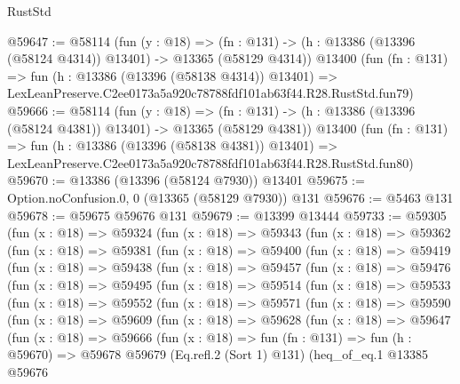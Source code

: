 \begin{lexlean}{RustStd}
\begin{coremodule}
@59647 := @58114
    (fun (y : @18) =>
    (fn : @131) -> (h : @13386 (@13396 (@58124 @4314)) @13401) -> @13365 (@58129 @4314))
    @13400
    (fun (fn : @131) =>
    fun (h : @13386 (@13396 (@58138 @4314)) @13401) =>
    LexLeanPreserve.C2ee0173a5a920c78788fdf101ab63f44.R28.RustStd.fun79)
@59666 := @58114
    (fun (y : @18) =>
    (fn : @131) -> (h : @13386 (@13396 (@58124 @4381)) @13401) -> @13365 (@58129 @4381))
    @13400
    (fun (fn : @131) =>
    fun (h : @13386 (@13396 (@58138 @4381)) @13401) =>
    LexLeanPreserve.C2ee0173a5a920c78788fdf101ab63f44.R28.RustStd.fun80)
@59670 := @13386 (@13396 (@58124 @7930)) @13401
@59675 := Option.noConfusion.{0, 0} (@13365 (@58129 @7930)) @131
@59676 := @5463 @131
@59678 := @59675 @59676 @131
@59679 := @13399 @13444
@59733 := @59305
    (fun (x : @18) =>
    @59324
      (fun (x : @18) =>
      @59343
        (fun (x : @18) =>
        @59362
          (fun (x : @18) =>
          @59381
            (fun (x : @18) =>
            @59400
              (fun (x : @18) =>
              @59419
                (fun (x : @18) =>
                @59438
                  (fun (x : @18) =>
                  @59457
                    (fun (x : @18) =>
                    @59476
                      (fun (x : @18) =>
                      @59495
                        (fun (x : @18) =>
                        @59514
                          (fun (x : @18) =>
                          @59533
                            (fun (x : @18) =>
                            @59552
                              (fun (x : @18) =>
                              @59571
                                (fun (x : @18) =>
                                @59590
                                  (fun (x : @18) =>
                                  @59609
                                    (fun (x : @18) =>
                                    @59628
                                      (fun (x : @18) =>
                                      @59647
                                        (fun (x : @18) =>
                                        @59666
                                          (fun (x : @18) =>
                                          fun (fn : @131) =>
                                          fun (h : @59670) =>
                                          @59678
                                            @59679
                                            (Eq.refl.{2} (Sort 1) @131)
                                            (heq_of_eq.{1}
                                              @13385
                                              @59676

\end{coremodule}
\end{lexlean}
